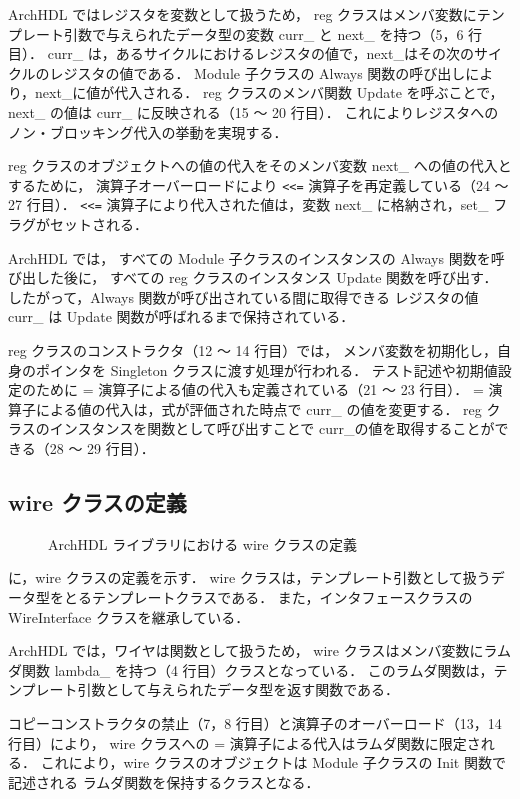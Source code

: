 ArchHDL ではレジスタを変数として扱うため，
reg クラスはメンバ変数にテンプレート引数で与えられたデータ型の変数 curr\_ と next\_ を持つ（5，6 行目）．
curr\_ は，あるサイクルにおけるレジスタの値で，next\_はその次のサイクルのレジスタの値である．
Module 子クラスの Always 関数の呼び出しにより，next\_に値が代入される．
reg クラスのメンバ関数 Update を呼ぶことで，next\_ の値は curr\_ に反映される（15 ～ 20 行目）．
これによりレジスタへのノン・ブロッキング代入の挙動を実現する．

reg クラスのオブジェクトへの値の代入をそのメンバ変数 next\_ への値の代入とするために，
演算子オーバーロードにより \verb`<<=` 演算子を再定義している（24 ～ 27 行目）．
\verb`<<=` 演算子により代入された値は，変数 next\_ に格納され，set\_ フラグがセットされる．

ArchHDL では，
すべての Module 子クラスのインスタンスの Always 関数を呼び出した後に，
すべての reg クラスのインスタンス Update 関数を呼び出す．
したがって，Always 関数が呼び出されている間に取得できる
レジスタの値 curr\_ は Update 関数が呼ばれるまで保持されている．

reg クラスのコンストラクタ（12 ～ 14 行目）では，
メンバ変数を初期化し，自身のポインタを Singleton クラスに渡す処理が行われる．
テスト記述や初期値設定のために = 演算子による値の代入も定義されている（21 ～ 23 行目）．
= 演算子による値の代入は，式が評価された時点で curr\_ の値を変更する．
reg クラスのインスタンスを関数として呼び出すことで curr\_の値を取得することができる（28 ～ 29 行目）．


\subsection{wire クラスの定義}

\begin{figure}[t]
 
 \caption{ArchHDL ライブラリにおける wire クラスの定義}
 \label{src:wire}
\end{figure}

 に，wire クラスの定義を示す．
wire クラスは，テンプレート引数として扱うデータ型をとるテンプレートクラスである．
また，インタフェースクラスの WireInterface クラスを継承している．

ArchHDL では，ワイヤは関数として扱うため，
wire クラスはメンバ変数にラムダ関数 lambda\_ を持つ（4 行目）クラスとなっている．
このラムダ関数は，テンプレート引数として与えられたデータ型を返す関数である．

コピーコンストラクタの禁止（7，8 行目）と演算子のオーバーロード（13，14 行目）により，
wire クラスへの = 演算子による代入はラムダ関数に限定される．
これにより，wire クラスのオブジェクトは Module 子クラスの Init 関数で記述される
ラムダ関数を保持するクラスとなる．

